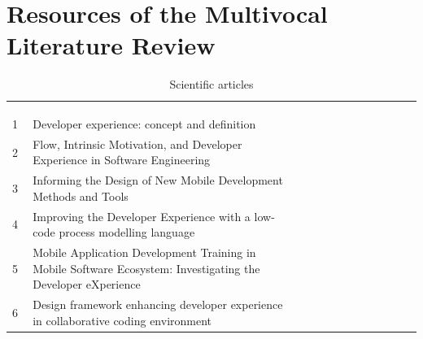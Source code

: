 \documentclass[english, 12pt, a4paper, sci, utf8, a-1b, online]{aaltothesis}
\begin{document}
\section{Resources of the Multivocal Literature Review \label{mlr-resources}}

\renewcommand{\arraystretch}{1.2}

\begin{center}
  \begin{longtable}{p{0.05\linewidth}p{0.65\linewidth}p{0.30\linewidth}}
    \captionsetup{width=0.6\textwidth}                                                                                                                                                                   \\
    \caption{Scientific articles}                                                                                                                                                                        \\
    \label{table:scientific-articles}                                                                                                                                                                    \\
    1  & Developer experience: concept and definition                                                                                                & \cite{fagerholm-dx-concept-and-definition}        \\
    2  & Flow, Intrinsic Motivation, and Developer Experience in Software Engineering                                                                & \cite{flow-intrinsic-dx}                          \\
    3  & Informing the Design of New Mobile Development Methods and Tools                                                                            & \cite{nebeling2013informing}                      \\
    4  & Improving the Developer Experience with a low-code process modelling language                                                               & \cite{henriques2018improving}                     \\
    5  & Mobile Application Development Training in Mobile Software Ecosystem: Investigating the Developer eXperience                                & \cite{fontao2018mobile}                           \\
    6  & Design framework enhancing developer experience in collaborative coding environment                                                         & \cite{design-framework-enchancing}                \\

\end{longtable}
\end{center}
\end{document}
